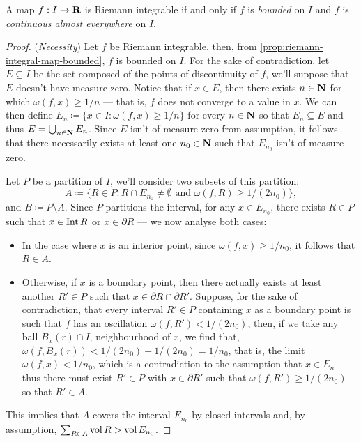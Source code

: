 \begin{theorem}
    \label{thm:lebesgue-criterion-integrable}
    A map \(f: I \to \mathbf{R}\) is Riemann integrable if and only if \(f\) is
    \emph{bounded} on \(I\) and \(f\) is \emph{continuous almost everywhere} on
    \(I\).
\end{theorem}

\begin{proof}
    (\emph{Necessity}) Let \(f\) be Riemann integrable, then, from
    \cref{prop:riemann-integral-map-bounded}, \(f\) is bounded on \(I\). For the
    sake of contradiction, let \(E \subseteq I\) be the set composed of the points
    of discontinuity of \(f\), we'll suppose that \(E\) doesn't have measure
    zero. Notice that if \(x \in E\), then there exists \(n \in \mathbf{N}\) for which
    \(\omega(f, x) \geq 1/n\) --- that is, \(f\) does not converge to a value in
    \(x\). We can then define \(E_n \coloneq \{x \in I \colon \omega(f, x) \geq 1/n\}\)
    for every \(n \in \mathbf{N}\) so that \(E_n \subseteq E\) and thus \(E = \bigcup_{n \in
        \mathbf{N}} E_n\). Since \(E\) isn't of measure zero from assumption, it follows that
    there necessarily exists at least one \(n_0 \in \mathbf{N}\) such that \(E_{n_0}\) isn't
    of measure zero.

    Let \(P\) be a partition of \(I\), we'll consider two subsets of this partition:
    \[
        A \coloneq \{R \in P \colon R \cap E_{n_{0}} \neq \emptyset
        \text{ and } \omega(f, R) \geq 1/(2n_0)\},
    \]
    and \(B \coloneq P \setminus A\). Since \(P\) partitions the interval, for any
    \(x \in E_{n_0}\), there exists \(R \in P\) such that \(x \in \operatorname{Int} R\) or \(x
    \in \partial R\) --- we now analyse both cases:
    \begin{itemize}\setlength\itemsep{0em}
        \item In the case where \(x\) is an interior point, since \(\omega(f, x) \geq
              1/n_0\), it follows that \(R \in A\).
        \item Otherwise, if \(x\) is a boundary point, then there actually exists at
              least another \(R' \in P\) such that \(x \in \partial R \cap \partial
              R'\). Suppose, for the sake of contradiction, that every interval \(R' \in P\)
              containing \(x\) as a boundary point is such that \(f\) has an oscillation
              \(\omega(f, R') < 1/(2n_0)\), then, if we take any ball \(B_x(r) \cap I\),
              neighbourhood of \(x\), we find that, \(\omega(f, B_x(r)) < 1/(2n_0) +
              1/(2n_0) = 1/n_0\), that is, the limit \(\omega(f, x) < 1/n_0\), which is a
              contradiction to the assumption that \(x \in E_n\) --- thus there must exist
              \(R' \in P\) with \(x \in \partial R'\) such that \(\omega(f, R') \geq
              1/(2n_0)\) so that \(R' \in A\).
    \end{itemize}
    This implies that \(A\) covers the interval \(E_{n_0}\) by closed intervals and,
    by assumption, \(\sum_{R \in A} \operatorname{vol} R > \operatorname{vol} E_{n_0}\).


\end{proof}
